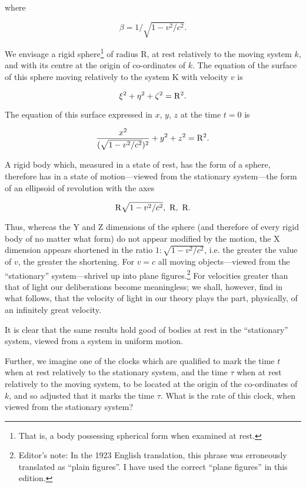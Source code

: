 \documentclass{article}
\newcounter{fnsave}
\newcommand{\edNoteBegin}{
\renewcommand{\thefootnote}{\fnsymbol{footnote}}
\setcounter{fnsave}{\value{footnote}}
\setcounter{footnote}{1}
}
\newcommand{\edNoteEnd}{
\renewcommand{\thefootnote}{\arabic{footnote}}
\setcounter{footnote}{\value{fnsave}}
}
\begin{document}
\noindent
where

\[
\beta=1/\sqrt{1-v^2/c^2}.
\]


We envisage a rigid sphere\footnote{That is, a body possessing
spherical form when examined at rest.} of radius R, at rest
relatively to the moving system $k$, and with its centre at the
origin of co-ordinates of $k$.  The equation of the surface of
this sphere moving relatively to the system K with velocity $v$ is
 
\[
\xi^2+\eta^2+\zeta^2={\rm R}^2.
\]

\noindent
The equation of this surface expressed in $x$, $y$, $z$ at the time $t=0$ is

\[
\frac{x^2}{(\sqrt{1-v^2/c^2})^2}+y^2+z^2={\rm R}^2.
\]

\noindent
A rigid body which, measured in a state of rest, has the form of a
sphere, therefore has in a state of motion---viewed from the stationary
system---the form of an ellipsoid of revolution with the axes

\[
{\rm R}\sqrt{1-v^2/c^2},\ {\rm R},\ {\rm R}.
\]

\edNoteBegin
Thus, whereas the Y and Z dimensions of the sphere (and therefore of
every rigid body of no matter what form) do not appear modified by the
motion, the X dimension appears shortened in the ratio
$1:\sqrt{1-v^2/c^2}$,
i.e.
the greater the value of $v$, the greater the shortening.  For $v=c$ all
moving objects---viewed from the ``stationary'' system---shrivel up into
plane figures.\footnote{{\sf Editor's note:  In the 1923
English translation, this phrase was erroneously translated as
``plain figures''.  I have used the correct
``plane figures'' in this edition.}}
For velocities greater than that of light our
deliberations become meaningless; we shall, however, find in what
follows, that the velocity of light in our theory plays the part,
physically, of an infinitely great velocity.
\edNoteEnd

It is clear that the same results hold good of bodies at rest in
the ``stationary'' system, viewed from a system in uniform motion.

Further, we imagine one of the clocks which are qualified to
mark the time $t$ when at rest relatively to the stationary
system, and the time $\tau$ when at rest relatively to the
moving system, to be located at the origin of the co-ordinates
of $k$, and so adjusted that it marks the time $\tau$.  What is
the rate of this clock, when viewed from the stationary system?
\end{document}
